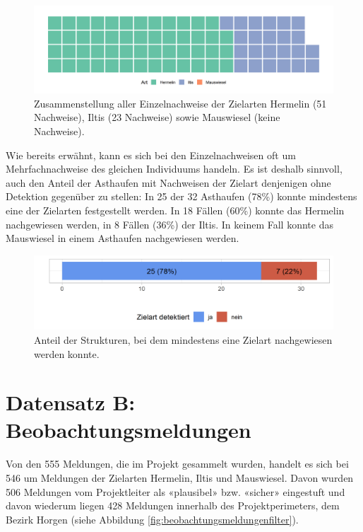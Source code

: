 \documentclass[
]{scrbook}
\begin{document}
\begin{figure}
\includegraphics[width=1\linewidth]{images/wirkungskontrolle_spontan_einzelnachweise_waffle} \caption{Zusammenstellung aller Einzelnachweise der Zielarten Hermelin (51 Nachweise), Iltis (23 Nachweise) sowie Mauswiesel (keine Nachweise).}\label{fig:wirkungskontrollespontaneinzelnachweisewaffle}
\end{figure}

Wie bereits erwähnt, kann es sich bei den Einzelnachweisen oft um Mehrfachnachweise des gleichen Individuums handeln. Es ist deshalb sinnvoll, auch den Anteil der Asthaufen mit Nachweisen der Zielart denjenigen ohne Detektion gegenüber zu stellen: In 25 der 32 Asthaufen (78\%) konnte mindestens eine der Zielarten festgestellt werden. In 18 Fällen (60\%) konnte das Hermelin nachgewiesen werden, in 8 Fällen (36\%) der Iltis. In keinem Fall konnte das Mauswiesel in einem Asthaufen nachgewiesen werden.



\begin{figure}
\includegraphics[width=1\linewidth]{images/wirkungskontrolle_spontan_strukturen_mit_zielart} \caption{Anteil der Strukturen, bei dem mindestens eine Zielart nachgewiesen werden konnte.}\label{fig:wirkungskontrollespontanstrukturenmitzielart}
\end{figure}

\hypertarget{datensatz-b-beobachtungsmeldungen-1}{%
\section{Datensatz B: Beobachtungsmeldungen}\label{datensatz-b-beobachtungsmeldungen-1}}

Von den 555 Meldungen, die im Projekt gesammelt wurden, handelt es sich bei 546 um Meldungen der Zielarten Hermelin, Iltis und Mauswiesel. Davon wurden 506 Meldungen vom Projektleiter als «plausibel» bzw. «sicher» eingestuft und davon wiederum liegen 428 Meldungen innerhalb des Projektperimeters, dem Bezirk Horgen (siehe Abbildung \ref{fig:beobachtungsmeldungenfilter}).
\end{document}
